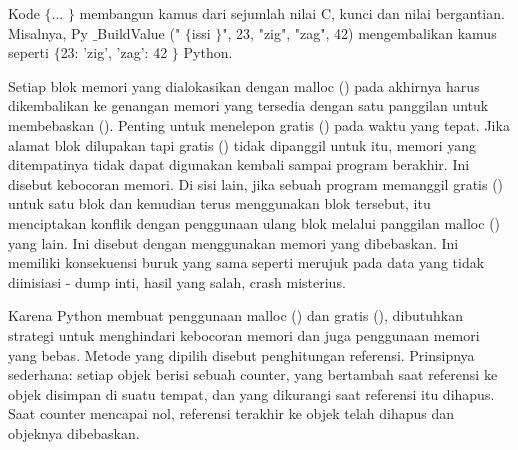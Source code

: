 

\vspace{12pt}
Kode  $  \{  $... $  \}  $ membangun kamus dari sejumlah nilai C, kunci dan nilai bergantian. Misalnya, Py $  \_  $BuildValue (" $  \{  $issi $  \}  $", 23, "zig", "zag", 42) mengembalikan kamus seperti  $  \{  $23: 'zig', 'zag': 42 $  \}  $ Python. \par
Setiap blok memori yang dialokasikan dengan malloc () pada akhirnya harus dikembalikan ke genangan memori yang tersedia dengan satu panggilan untuk membebaskan (). Penting untuk menelepon gratis () pada waktu yang tepat. Jika alamat blok dilupakan tapi gratis () tidak dipanggil untuk itu, memori yang ditempatinya tidak dapat digunakan kembali sampai program berakhir. Ini disebut kebocoran memori. Di sisi lain, jika sebuah program memanggil gratis () untuk satu blok dan kemudian terus menggunakan blok tersebut, itu menciptakan konflik dengan penggunaan ulang blok melalui panggilan malloc () yang lain. Ini disebut dengan menggunakan memori yang dibebaskan. Ini memiliki konsekuensi buruk yang sama seperti merujuk pada data yang tidak diinisiasi - dump inti, hasil yang salah, crash misterius. \par
Karena Python membuat penggunaan malloc () dan gratis (), dibutuhkan strategi untuk menghindari kebocoran memori dan juga penggunaan memori yang bebas. Metode yang dipilih disebut penghitungan referensi. Prinsipnya sederhana: setiap objek berisi sebuah counter, yang bertambah saat referensi ke objek disimpan di suatu tempat, dan yang dikurangi saat referensi itu dihapus. Saat counter mencapai nol, referensi terakhir ke objek telah dihapus dan objeknya dibebaskan. \par
